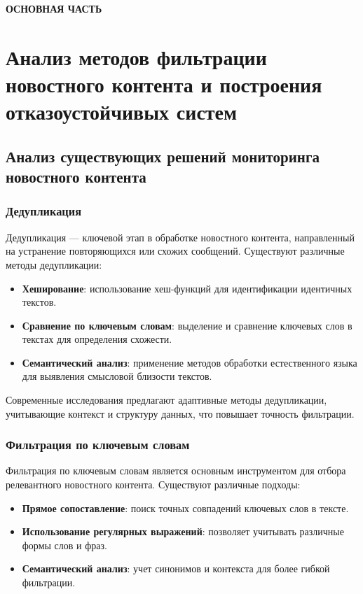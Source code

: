 \newpage

{\centering
\normal
\textbf{ОСНОВНАЯ ЧАСТЬ}\par
}

\section{Анализ методов фильтрации новостного контента и построения отказоустойчивых систем}

\subsection{Анализ существующих решений мониторинга новостного контента}\label{subsec:anal11}

\subsubsection{Дедупликация}\label{subsubsec:anal111}
Дедупликация — ключевой этап в обработке новостного контента, направленный на устранение повторяющихся или схожих сообщений.
Существуют различные методы дедупликации:
\begin{itemize}
    \item \textbf{Хеширование}: использование хеш-функций для идентификации идентичных текстов.
    \item \textbf{Сравнение по ключевым словам}: выделение и сравнение ключевых слов в текстах для определения схожести.
    \item \textbf{Семантический анализ}: применение методов обработки естественного языка для выявления смысловой близости текстов.
\end{itemize}

Современные исследования предлагают адаптивные методы дедупликации, учитывающие контекст и структуру данных, что повышает точность фильтрации.

\subsubsection{Фильтрация по ключевым словам}\label{subsubsec:anal112}
Фильтрация по ключевым словам является основным инструментом для отбора релевантного новостного контента.
Существуют различные подходы:
\begin{itemize}
    \item \textbf{Прямое сопоставление}: поиск точных совпадений ключевых слов в тексте.
    \item \textbf{Использование регулярных выражений}: позволяет учитывать различные формы слов и фраз.
    \item \textbf{Семантический анализ}: учет синонимов и контекста для более гибкой фильтрации.
\end{itemize}

